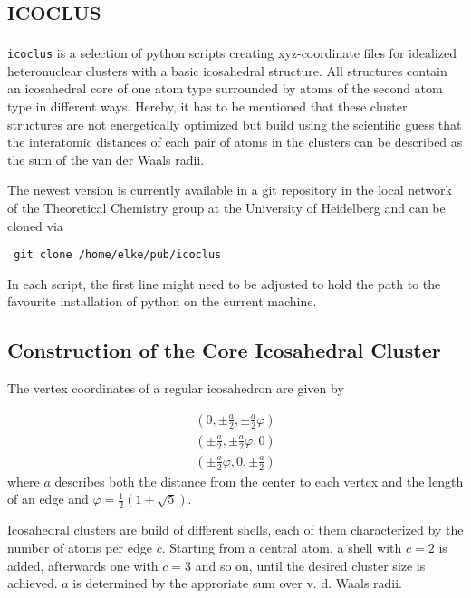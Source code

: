 \section{\textsc{icoclus}}
\label{icoclus}

\verb|icoclus| is a selection of python scripts creating xyz-coordinate
files for idealized heteronuclear clusters with a basic
icosahedral structure.
All structures contain an icosahedral core of one atom type
surrounded by atoms of the second atom type in different ways.
Hereby, it has to be mentioned that these cluster structures are not
energetically optimized but build using the scientific guess
that the interatomic distances of each pair of atoms in the clusters
can be described as the sum of the van der Waals
radii.

The newest version is currently available in a git repository in the local
network of the Theoretical Chemistry group at the University of
Heidelberg and can be cloned via
\begin{verbatim}
 git clone /home/elke/pub/icoclus 
\end{verbatim}

In each script, the first line might need to be adjusted to hold
the path to the favourite installation of python on the current machine.


\subsection{Construction of the Core Icosahedral Cluster}
The vertex coordinates of a regular icosahedron are given by
\cite{wikipedia_ikosaeder}

\begin{align}
  \left(  0 , \pm \frac a2 ,  \pm\frac a2 \varphi \right) \nonumber\\
  \left(  \pm\frac a2 , \pm \frac a2 \varphi ,  0 \right) \nonumber\\
  \left(  \pm \frac a2 \varphi , 0 ,  \pm\frac a2 \right)
\end{align}
where $a$ describes both the distance from the center to each vertex
and the length of an edge and $\varphi = \frac 12 (1+\sqrt{5})$.

Icosahedral clusters are build of different shells, each of them
characterized by the number of atoms per edge $c$. Starting from a
central atom, a shell with $c=2$ is added, afterwards one with $c=3$
and so on, until the desired cluster size is achieved.
$a$ is determined by the approriate sum over v. d. Waals radii.

